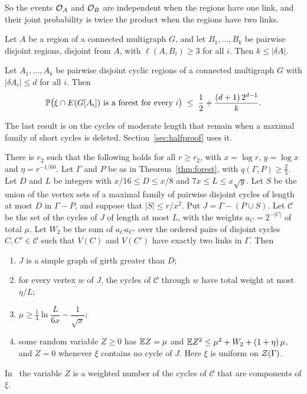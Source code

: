 So the events $\mathcal{O}_A$ and $\mathcal{O}_B$ are independent when the regions have one link, and their joint
probability is twice the product when the regions have two links.

\begin{lemma}\label{lem:exc}
Let $A$ be a region of a connected multigraph $G$, and let $B_1,\dots,B_k$ be pairwise disjoint
regions, disjoint from $A$, with $\ell(A,B_i)\ge3$ for all $i$. Then $k\le|\delta A|$.
\end{lemma}

\begin{lemma}\label{lem:smallcuts}
Let $A_1,\dots,A_k$ be pairwise disjoint cyclic regions of a connected multigraph $G$ with
$|\delta A_i|\le d$ for all $i$. Then
\[
  \mathbb{P}\bigl(\xi\cap E(G[A_i])\text{ is a forest for every }i\bigr)\;\le\;\frac12+\frac{(d+1)\,2^{d-1}}{k}.
\]
\end{lemma}

The last result is on the cycles of moderate length that remain when a maximal family of short
cycles is deleted. Section~\ref{sec:halfproof} uses it.

\begin{proposition}\label{prop:loggirth}
There is $r_2$ such that the following holds for all $r\ge r_2$, with $x=\log r$, $y=\log x$ and
$\eta=r^{-1/60}$. Let $\Gamma$ and $P$ be as in Theorem~\ref{thm:forest}, with
$q(\Gamma,P)\ge\frac25$. Let $D$ and $L$ be integers with $x/16\le D\le x/8$ and
$7x\le L\le x\sqrt y$. Let $S$ be the union of the vertex sets of a maximal family of pairwise
disjoint cycles of length at most $D$ in $\Gamma-P$, and suppose that $|S|\le r/x^{2}$. Put
$J=\Gamma-(P\cup S)$. Let $\mathcal C$ be the set of the cycles of $J$ of length at most $L$,
with the weights $a_C=2^{-|C|}$ of total $\mu$. Let $W_2$ be the sum of $a_Ca_{C'}$ over the
ordered pairs of disjoint cycles $C,C'\in\mathcal C$ such that $V(C)$ and $V(C')$ have exactly
two links in $\Gamma$. Then
\begin{enumerate}
\item[\textup{(i)}] $J$ is a simple graph of girth greater than $D$;
\item[\textup{(ii)}] for every vertex $w$ of $J$, the cycles of $\mathcal C$ through $w$ have
total weight at most $\eta/L$;
\item[\textup{(iii)}] $\mu\ge\frac14\ln\dfrac{L}{6x}-\dfrac1{\sqrt x}$;
\item[\textup{(iv)}] some random variable $Z\ge0$ has $\mathbb{E} Z=\mu$ and
$\mathbb{E} Z^{2}\le\mu^{2}+W_2+(1+\eta)\,\mu$, and $Z=0$ whenever $\xi$ contains no cycle of $J$. Here
$\xi$ is uniform on $\mathcal{Z}(\Gamma)$.
\end{enumerate}
\end{proposition}

In~\cite{Forest} the variable $Z$ is a weighted number of the cycles of $\mathcal C$ that are
components of $\xi$.
